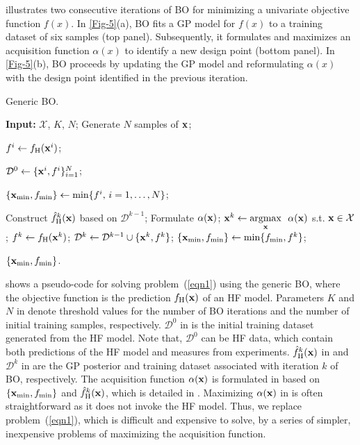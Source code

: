 \documentclass[iicol,sn-basic]{sn-jnl}%
\newcommand{\edit}[1]{\textcolor{red}{#1}} %
\begin{document}
 illustrates two consecutive iterations of BO for minimizing a univariate objective function $f(x)$.
In \cref{Fig-5}(a), BO fits a GP model for $f(x)$ to a training dataset of six samples (top panel).
Subsequently, it formulates and maximizes an acquisition function $\alpha(x)$ to identify a new design point (bottom panel).
In \cref{Fig-5}(b), BO proceeds by updating the GP model and reformulating $\alpha(x)$ with the design point identified in the previous iteration.

\begin{algorithm}
	\caption{Generic BO.}\label{Algo1}
	\begin{algorithmic}[1]
		\State \textbf{Input:} $\mathcal{X}$, $K$, $N$; \label{Algo1:1}
		\State Generate $N$ samples of ${\bf x}$; 
		
		\State $f^i \gets f_\text{H}({\bf x}^i)$; \textcolor{black}{}
		\EndFor
		
		\State $\mathcal{D}^0 \gets \{{\bf x}^i,f^i\}_{i=1}^N$; \label{Algo1:6}
		
		\State $\{{\bf x}_{\min},f_{\min}\} \gets \min\{f^i,\, i=1,\dots, N\}$;
		
		\State Construct $\hat{f}_\text{H}^k({\bf x})$ based on $\mathcal{D}^{k-1}$; \label{Algo1:9}
		\State Formulate $\alpha({\bf x})$; \label{Algo1:10}
		\State ${\bf x}^{k} \gets \underset{{\bf x}}{\mathrm{argmax}} \ \ \alpha({\bf x})$ s.t. ${\bf x} \in \mathcal{X}$; \label{Algo1:11}
		\State $f^{k} \gets f_\text{H}({\bf x}^{k})$;
		\textcolor{black}{} \label{Algo1:12}
		\State $\mathcal{D}^k\gets\mathcal{D}^{k-1} \cup \{{\bf x}^{k},f^{k}\}$; \label{Algo1:13}
		\State $\{{\bf x}_{\min},f_{\min}\} \gets \min\{f_{\min},f^{k}\}$;
		\EndFor
		
		\State \Return $\{{\bf x}_{\min},f_{\min}\}$.
	\end{algorithmic}
\end{algorithm}

 shows a pseudo-code for solving problem~(\ref{eqn1}) using the generic BO, where the objective function is the prediction $f_\text{H}(\bf x)$ of an HF model.
Parameters $K$ and $N$ in  denote threshold values for the number of BO iterations and the number of initial training samples, respectively.
$\mathcal{D}^{0}$ in  is the initial training dataset generated from the HF model.
Note that, $\mathcal{D}^{0}$ can be HF data, which contain both predictions of the HF model and measures from experiments.  
$\hat{f}_\text{H}^k({\bf x})$ in  and $\mathcal{D}^{k}$ in  are the GP posterior and training dataset associated with iteration $k$ of BO, respectively.
The acquisition function $\alpha({\bf x})$ is formulated in  based on $\{{\bf x}_{\min},f_{\min}\}$ and $\hat{f}_\text{H}^k({\bf x})$, which is detailed in .
Maximizing $\alpha({\bf x})$ in  is often straightforward as it does not invoke the HF model.
{Thus, we replace problem~(\ref{eqn1}), which is difficult and expensive to solve, by a series of simpler, inexpensive problems of maximizing the acquisition function.}
\end{document}
